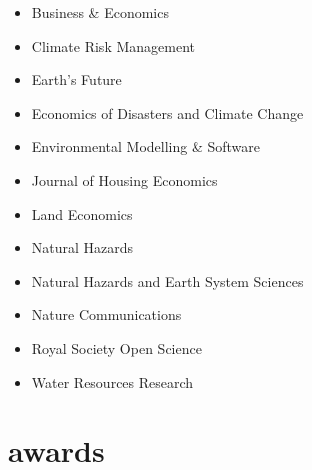 \documentclass[10pt,oneside]{article}
\begin{document}
\begin{itemize}[label={}]
  
    \item Business \& Economics
  
    \item Climate Risk Management
  
    \item Earth's Future
  
    \item Economics of Disasters and Climate Change
  
    \item Environmental Modelling \& Software
  
    \item Journal of Housing Economics
  
    \item Land Economics
  
    \item Natural Hazards
  
    \item Natural Hazards and Earth System Sciences
  
    \item Nature Communications
  
    \item Royal Society Open Science
  
    \item Water Resources Research
  
\end{itemize}


\section{awards}

\mbox{}\vspace{-\dimexpr\baselineskip\relax}
\end{document}
